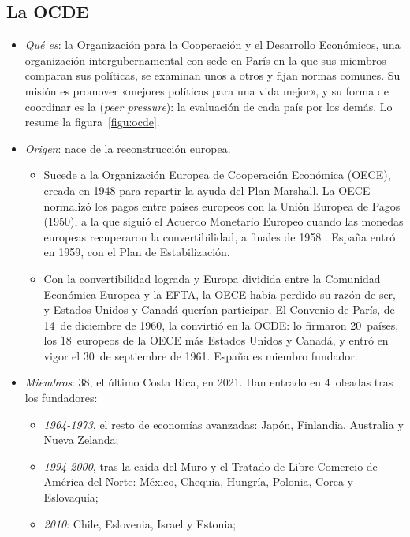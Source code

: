 \documentclass[11pt]{article}
\begin{document}
\subsection{La OCDE}\label{sec:ocde}

\begin{itemize}
\item \emph{Qué es}: la Organización para la Cooperación y el Desarrollo Económicos, una organización intergubernamental con sede en París en la que sus miembros comparan sus políticas, se examinan unos a otros y fijan normas comunes. Su misión es promover «mejores políticas para una vida mejor», y su forma de coordinar es la  (\emph{peer pressure}): la evaluación de cada país por los demás. Lo resume la figura~\ref{figu:ocde}.
\item \emph{Origen}: nace de la reconstrucción europea.
  \begin{itemize}
  \item Sucede a la Organización Europea de Cooperación Económica (OECE), creada en 1948 para repartir la ayuda del Plan Marshall. La OECE normalizó los pagos entre países europeos con la Unión Europea de Pagos (1950), a la que siguió el Acuerdo Monetario Europeo cuando las monedas europeas recuperaron la convertibilidad, a finales de 1958 . España entró en 1959, con el Plan de Estabilización.
  \item Con la convertibilidad lograda y Europa dividida entre la Comunidad Económica Europea y la EFTA, la OECE había perdido su razón de ser, y Estados Unidos y Canadá querían participar. El Convenio de París, de 14~de diciembre de 1960, la convirtió en la OCDE: lo firmaron 20~países, los 18~europeos de la OECE más Estados Unidos y Canadá, y entró en vigor el 30~de septiembre de 1961. España es miembro fundador\nocite{BOE1963OCDE}.
  \end{itemize}
\item \emph{Miembros}: 38, el último Costa Rica, en 2021\nocite{OCDE2026Miembros}. Han entrado en 4~oleadas tras los fundadores:
  \begin{itemize}
  \item \emph{1964-1973}, el resto de economías avanzadas: Japón, Finlandia, Australia y Nueva Zelanda;
  \item \emph{1994-2000}, tras la caída del Muro y el Tratado de Libre Comercio de América del Norte: México, Chequia, Hungría, Polonia, Corea y Eslovaquia;
  \item \emph{2010}: Chile, Eslovenia, Israel y Estonia\nocite{OCDE2026Miembros};

\end{itemize}
\end{itemize}
\end{document}
